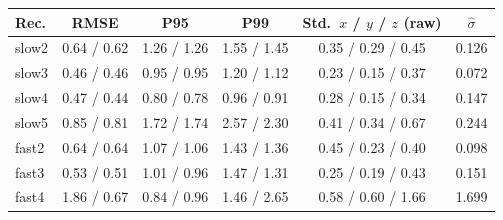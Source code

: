 \begin{tabular}{lccccc}
\hline
Rec. & RMSE & P95 & P99 & Std.\ $x$ / $y$ / $z$ (raw) & $\hat\sigma$ \\
\hline
slow2 & 0.64 / 0.62 & 1.26 / 1.26 & 1.55 / 1.45 & 0.35 / 0.29 / 0.45 & 0.126 \\
slow3 & 0.46 / 0.46 & 0.95 / 0.95 & 1.20 / 1.12 & 0.23 / 0.15 / 0.37 & 0.072 \\
slow4 & 0.47 / 0.44 & 0.80 / 0.78 & 0.96 / 0.91 & 0.28 / 0.15 / 0.34 & 0.147 \\
slow5 & 0.85 / 0.81 & 1.72 / 1.74 & 2.57 / 2.30 & 0.41 / 0.34 / 0.67 & 0.244 \\
\hline
fast2 & 0.64 / 0.64 & 1.07 / 1.06 & 1.43 / 1.36 & 0.45 / 0.23 / 0.40 & 0.098 \\
fast3 & 0.53 / 0.51 & 1.01 / 0.96 & 1.47 / 1.31 & 0.25 / 0.19 / 0.43 & 0.151 \\
fast4 & 1.86 / 0.67 & 0.84 / 0.96 & 1.46 / 2.65 & 0.58 / 0.60 / 1.66 & 1.699 \\
\hline
\end{tabular}
